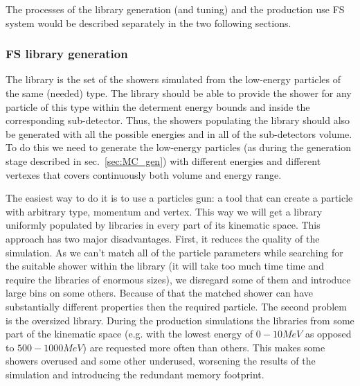 The processes of the library generation (and tuning) and the production use FS system would be described separately in the two following sections.

\subsubsection{FS library generation}
\label{sec:MC_FS_gen}

The library is the set of the showers simulated from the low-energy particles of the same (needed) type. The library should be able to provide the shower for any particle of this type within the determent energy bounds and inside the corresponding sub-detector. Thus, the showers populating the library should also be generated with all the possible energies and in all of the sub-detectors volume. To do this we need to generate the low-energy particles (as during the generation stage described in sec.~\ref{sec:MC_gen}) with different energies and different vertexes that covers continuously both volume and energy range.

The easiest way to do it is to use a particles gun: a tool that can create a particle with arbitrary type, momentum and vertex. This way we will get a library uniformly populated by libraries in every part of its kinematic space. This approach has two major disadvantages. First, it reduces the quality of the simulation. As we can't match all of the particle parameters while searching for the suitable shower within the library (it will take too much time time and require the libraries of enormous sizes), we disregard some of them and introduce large bins on some others. Because of that the matched shower can have substantially different properties then the required particle. The second problem is the oversized library. During the production simulations the libraries from some part of the kinematic space (e.g. with the lowest energy of $0-10 MeV$ as opposed to $500-1000 MeV$) are requested more often than others. This makes some showers overused and some other underused, worsening the results of the simulation and introducing the redundant memory footprint.

